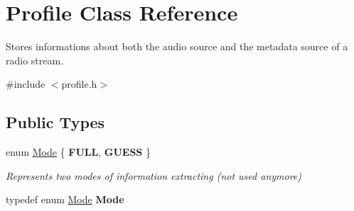 \hypertarget{classProfile}{
\section{Profile Class Reference}
\label{classProfile}
}


Stores informations about both the audio source and the metadata source of a radio stream.  




{\ttfamily \#include $<$profile.h$>$}

\subsection*{Public Types}
\begin{DoxyCompactItemize}
\item 
enum \hyperlink{classProfile_a5fd99d2c6609c9239cd94d9208f6051b}{Mode} \{ {\bfseries FULL}, 
{\bfseries GUESS}
 \}
\begin{DoxyCompactList}\small\item\em Represents two modes of information extracting (not used anymore) \item\end{DoxyCompactList}\item 
\hypertarget{classProfile_abbf40b13f78bb163c01926006c2d1933}{
typedef enum \hyperlink{classProfile_a5fd99d2c6609c9239cd94d9208f6051b}{Mode} {\bfseries Mode}}
\label{classProfile_abbf40b13f78bb163c01926006c2d1933}

\end{DoxyCompactItemize}
